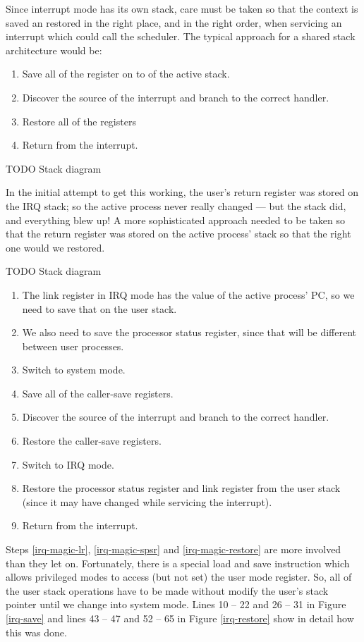 \documentclass[12pt]{article}
\newcommand{\TODO}[1]{{\huge\color{red}TODO \Large #1}}
\begin{document}
Since interrupt mode has its own stack, care must be taken so that the context
is saved an restored in the right place, and in the right order, when servicing
an interrupt which could call the scheduler. The typical approach for a shared
stack architecture would be:

\begin{enumerate}
\item Save all of the register on to of the active stack.
\item Discover the source of the interrupt and branch to the correct handler.
\item Restore all of the registers
\item Return from the interrupt.
\end{enumerate}

\TODO{Stack diagram}

In the initial attempt to get this working, the user's return register was
stored on the IRQ stack; so the active process never really changed \---- but
the stack did, and everything blew up! A more sophisticated approach needed to
be taken so that the return register was stored on the active process' stack so
that the right one would we restored.

\TODO{Stack diagram}

\begin{enumerate}
\item \label{irq-magic-lr}The link register in IRQ mode has the value of the
    active process' PC, so we need to save that on the user stack.
\item \label{irq-magic-spsr}We also need to save the processor status register, since that will be
    different between user processes. 
\item Switch to system mode.
\item Save all of the caller-save registers.
\item Discover the source of the interrupt and branch to the correct handler.
\item Restore the caller-save registers.
\item Switch to IRQ mode.
\item \label{irq-magic-restore}Restore the processor status register and link
    register from the user stack (since it may have changed while servicing the
    interrupt).
\item Return from the interrupt.
\end{enumerate}

Steps \ref{irq-magic-lr}, \ref{irq-magic-spsr} and \ref{irq-magic-restore}
are more involved than they let on. Fortunately, there is a special load and
save instruction which allows privileged modes to access (but not set) the user
mode register. So, all of the user stack operations have to be made without
modify the user's stack pointer until we change into system mode. Lines 10 \---
22 and 26 \--- 31 in Figure \ref{irq-save} and lines 43 \--- 47 and 52 \--- 65
in Figure \ref{irq-restore} show in detail how this was done.
\end{document}
